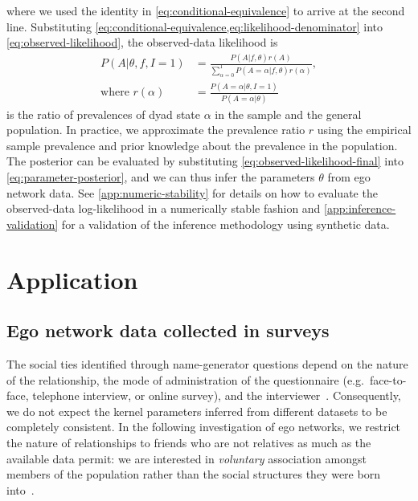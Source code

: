 \documentclass{scrartcl}
\begin{document}
where we used the identity in \cref{eq:conditional-equivalence} to arrive at the second line. Substituting \cref{eq:conditional-equivalence,eq:likelihood-denominator} into \cref{eq:observed-likelihood}, the observed-data likelihood is
\begin{align}
    P(A|\theta,f,I=1)&=\frac{P(A|f,\theta)r(A)}{\sum_{\alpha=0}^1 P(A=\alpha|f,\theta)r(\alpha)},\label{eq:observed-likelihood-final}\\
    \text{where }r(\alpha)&=\frac{P(A=\alpha|\theta,I=1)}{P(A=\alpha|\theta)}\nonumber
\end{align}
is the ratio of prevalences of dyad state $\alpha$ in the sample and the general population. In practice, we approximate the prevalence ratio $r$ using the empirical sample prevalence and prior knowledge about the prevalence in the population. The posterior can be evaluated by substituting \cref{eq:observed-likelihood-final} into \cref{eq:parameter-posterior}, and we can thus infer the parameters $\theta$ from ego network data. See \cref{app:numeric-stability} for details on how to evaluate the observed-data log-likelihood in a numerically stable fashion and \cref{app:inference-validation} for a validation of the inference methodology using synthetic data.

\section{Application\label{sec:application}}

\subsection{Ego network data collected in surveys}

The social ties identified through name-generator questions depend on the nature of the relationship, the mode of administration of the questionnaire (e.g.\ face-to-face, telephone interview, or online survey), and the interviewer~\cite{Marin2004,Eagle2015}. Consequently, we do not expect the kernel parameters inferred from different datasets to be completely consistent. In the following investigation of ego networks, we restrict the nature of relationships to friends who are not relatives as much as the available data permit: we are interested in \emph{voluntary} association amongst members of the population rather than the social structures they were born into~\cite{Kalmijn2007}.
\end{document}
